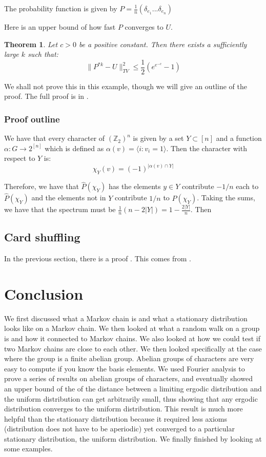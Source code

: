 \documentclass[]{article}
\newtheorem{theorem}{Theorem}
\theoremstyle{definition}
\numberwithin{theorem}{section}
\numberwithin{equation}{section}
\begin{document}
The probability function is given by $P = \frac{1}{n} \left(\delta_{e_1} ... \delta_{e_n}\right)$

Here is an upper bound of how fast $P$ converges to $U$. 
\begin{theorem}
	Let $c > 0$ be a positive constant. Then there exists a sufficiently large $k$ such that:
	\begin{equation}
		\|P^{\ast k} - U\|^2_{TV} \leq \frac{1}{2} (e^{e^{-c}} - 1)
	\end{equation}
\end{theorem}

We shall not prove this in this example, though we will give an outline of the proof. The full proof is in \cite{steinbergProbabilityRandomWalks2012}. 

\subsubsection{Proof outline}
We have that every character of $\left(\mathbb{Z}_2\right)^n$ is given by a set $Y \subset [n]$ and a function $\alpha: G \rightarrow 2^{[n]}$ which is defined as $\alpha(v) = \langle i : v_i = 1 \rangle$. Then the character with respect to $Y$ is:
\begin{equation}
	\chi_Y(v) = (-1)^{|\alpha(v) \cap Y|}
\end{equation}

Therefore, we have that $\hat{P}(\chi_Y)$ has the elements $y \in Y$ contribute $ -1/n$ each to $\hat{P}(\chi_Y)$ and the elements not in $Y$ contribute $1/n$ to $\hat{P}(\chi_Y)$. Taking the sums, we have that the spectrum must be $\frac{1}{n}(n - 2 |Y|) = 1 - \frac{2|Y|}{n}$. 
Then 

\subsection{Card shuffling}
In the previous section, there is a proof . This comes from \cite{bayerTrailingDovetailShuffle1992}. 
\section{Conclusion}
We first discussed what a Markov chain is and what a stationary distribution looks like on a Markov chain. We then looked at what a random walk on a group is and how it connected to Markov chains. We also looked at how we could test if two Markov chains are close to each other. We then looked specifically at the case where the group is a finite abelian group. Abelian groups of characters are very easy to compute if you know the basis elements. We used Fourier analysis to prove a series of results on abelian groups of characters, and eventually showed an upper bound of the of the distance between a limiting ergodic distribution and the uniform distribution can get arbitrarily small, thus showing that any ergodic distribution converges to the uniform distribution. This result is much more helpful than the stationary distribution because it required less axioms (distribution does not have to be aperiodic) yet converged to a particular stationary distribution, the uniform distribution. We finally finished by looking at some examples. 

\printbibliography
\end{document}

